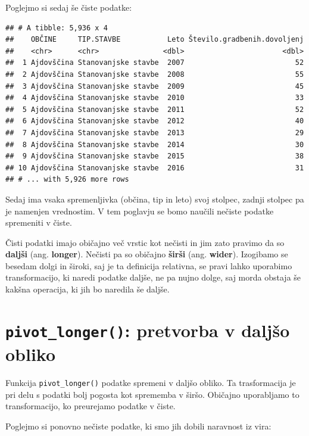 \documentclass[
]{book}
\begin{document}
Poglejmo si sedaj še čiste podatke:

\begin{verbatim}
## # A tibble: 5,936 x 4
##    OBČINE     TIP.STAVBE           Leto Število.gradbenih.dovoljenj
##    <chr>      <chr>               <dbl>                       <dbl>
##  1 Ajdovščina Stanovanjske stavbe  2007                          52
##  2 Ajdovščina Stanovanjske stavbe  2008                          55
##  3 Ajdovščina Stanovanjske stavbe  2009                          45
##  4 Ajdovščina Stanovanjske stavbe  2010                          33
##  5 Ajdovščina Stanovanjske stavbe  2011                          52
##  6 Ajdovščina Stanovanjske stavbe  2012                          40
##  7 Ajdovščina Stanovanjske stavbe  2013                          29
##  8 Ajdovščina Stanovanjske stavbe  2014                          30
##  9 Ajdovščina Stanovanjske stavbe  2015                          38
## 10 Ajdovščina Stanovanjske stavbe  2016                          31
## # ... with 5,926 more rows
\end{verbatim}

Sedaj ima vsaka spremenljivka (občina, tip in leto) svoj stolpec, zadnji stolpec pa je namenjen vrednostim. V tem poglavju se bomo naučili nečiste podatke spremeniti v čiste.

Čisti podatki imajo običajno več vrstic kot nečisti in jim zato pravimo da so \textbf{daljši} (ang. \textbf{longer}). Nečisti pa so običajno \textbf{širši} (ang. \textbf{wider}). Izogibamo se besedam dolgi in široki, saj je ta definicija relativna, se pravi lahko uporabimo transformacijo, ki naredi podatke daljše, ne pa nujno dolge, saj morda obstaja še kakšna operacija, ki jih bo naredila še daljše.

\hypertarget{pivot_longer-pretvorba-v-daljux161o-obliko}{%
\section{\texorpdfstring{\texttt{pivot\_longer()}: pretvorba v daljšo obliko}{pivot\_longer(): pretvorba v daljšo obliko}}\label{pivot_longer-pretvorba-v-daljux161o-obliko}}

Funkcija \texttt{pivot\_longer()} podatke spremeni v daljšo obliko. Ta trasformacija je pri delu s podatki bolj pogosta kot sprememba v širšo. Običajno uporabljamo to transformacijo, ko preurejamo podatke v čiste.

Poglejmo si ponovno nečiste podatke, ki smo jih dobili naravnost iz vira:
\end{document}
